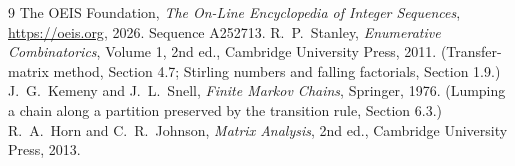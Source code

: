 \documentclass[11pt,a4paper]{article}
\theoremstyle{plain}
\theoremstyle{definition}
\begin{document}
\begin{thebibliography}{9}
 The OEIS Foundation, \emph{The On-Line Encyclopedia of Integer
Sequences}, \url{https://oeis.org}, 2026. Sequence A252713.
 R.~P.~Stanley, \emph{Enumerative Combinatorics}, Volume 1, 2nd ed.,
Cambridge University Press, 2011. (Transfer-matrix method, Section 4.7; Stirling numbers and
falling factorials, Section 1.9.)
 J.~G.~Kemeny and J.~L.~Snell, \emph{Finite Markov Chains}, Springer,
1976. (Lumping a chain along a partition preserved by the transition rule, Section 6.3.)
 R.~A.~Horn and C.~R.~Johnson, \emph{Matrix Analysis}, 2nd ed., Cambridge
University Press, 2013.
\end{thebibliography}
\end{document}
